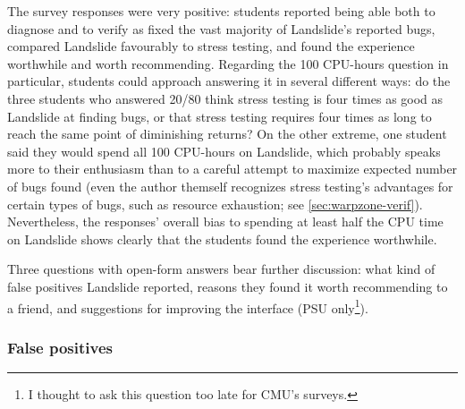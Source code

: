 The survey responses were very positive:
students reported being able both to diagnose and to verify as fixed the vast majority of Landslide's reported bugs,
compared Landslide favourably to stress testing,
and found the experience worthwhile and worth recommending.
Regarding the 100 CPU-hours question in particular,
students could approach answering it in several different ways:
do the three students who answered 20/80 think stress testing is four times as good as Landslide at finding bugs,
or that stress testing requires four times as long to reach the same point of diminishing returns?
On the other extreme, one student said they would spend all 100 CPU-hours on Landslide,
which probably speaks more to their enthusiasm than to a careful attempt to maximize expected number of bugs found
(even the author themself recognizes stress testing's advantages for certain types of bugs,
such as resource exhaustion; see \cref{sec:warpzone-verif}).
Nevertheless, the responses' overall bias to spending at least half the CPU time on Landslide
shows clearly that the students found the experience worthwhile.

Three questions with open-form answers bear further discussion:
what kind of false positives Landslide reported, %
reasons they found it worth recommending to a friend,
and suggestions for improving the interface
(PSU only\footnote{I thought to ask this question too late for CMU's surveys.}). %

\subsubsection{False positives}
\label{sec:education-eval-survey-falsepositives}

